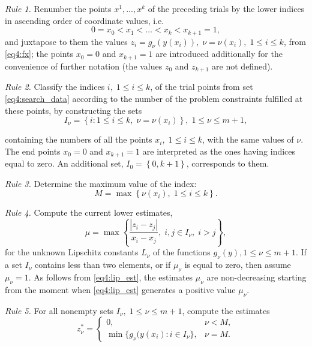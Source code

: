 \emph{Rule 1.} Renumber the points $x^1,...,x^k$ of the preceding trials by the lower indices in ascending order of coordinate values, i.e.
\begin{equation}
  \label{eq4:search_data}
  0=x_0<x_1<\dots <x_k<x_{k+1}=1,
\end{equation}
and juxtapose to them the values $z_i=g_\nu(y(x_i)), \; \nu=\nu(x_i), \; 1
\leq i \leq k$, from \eqref{eq4:fx}; the points $x_0=0$ and
$x_{k+1}=1$ are introduced additionally for the convenience  of further notation (the values $z_0$ and $z_{k+1}$ are not defined).

\emph{Rule 2.} Classify the indices $i, \; 1 \leq i \leq k$, of the trial points from set \eqref{eq4:search_data} according to the number of the problem constraints fulfilled at these points, by constructing the sets
\begin{equation}
  \label{eq4:13}
  I_\nu =\left\{i:1 \leq i \leq k, \; \nu=\nu(x_i) \right\}, \; 1 \leq \nu \leq m+1,
\end{equation}

containing the numbers of all the points $x_i, \; 1 \leq i \leq k$, with
the same values of $\nu$. The end points $x_0=0$ and $x_{k+1}=1$ are
interpreted as the ones having indices equal to zero. An additional set,
$I_0=\left\{0,k+1\right\}$, corresponds to them.

\emph{Rule 3.} Determine the maximum value of the index:
\begin{equation}
  M=\max\left\{\nu(x_i), \; 1 \leq i \leq k \right \}.
\end{equation}

\emph{Rule 4.} Compute the current lower estimates,
\begin{equation}
  \label{eq4:lip_est}
  \mu = \max\left\{ \frac{\left|z_i-z_j\right|}{ x_i - x_j }, \; i,j \in I_\nu, \; i>j \right\},
\end{equation}
for the unknown Lipschitz constants $L_\nu$ of the functions $g_\nu(y),1
\leq \nu \leq m+1$. If a set $I_\nu$ contains less than two elements, or
if $\mu_\nu$ is equal to zero, then assume $\mu_\nu=1$. As follows from \eqref{eq4:lip_est}, the estimates $\mu_\nu$ are non-decreasing starting from the moment when \eqref{eq4:lip_est} generates a positive value $\mu_\nu$.

\emph{Rule 5.} For all nonempty sets $I_\nu, \; 1 \leq \nu \leq m+1$, compute the estimates
\begin{equation}
  \label{eq4:z_const}
  z_\nu^\ast = \left\{
  \begin{array}{lr}
    0, & \nu < M,\\
    \min\{ g_\nu(y(x_i): i\in I_\nu \}, & \nu = M.
  \end{array}
  \right.
\end{equation}

